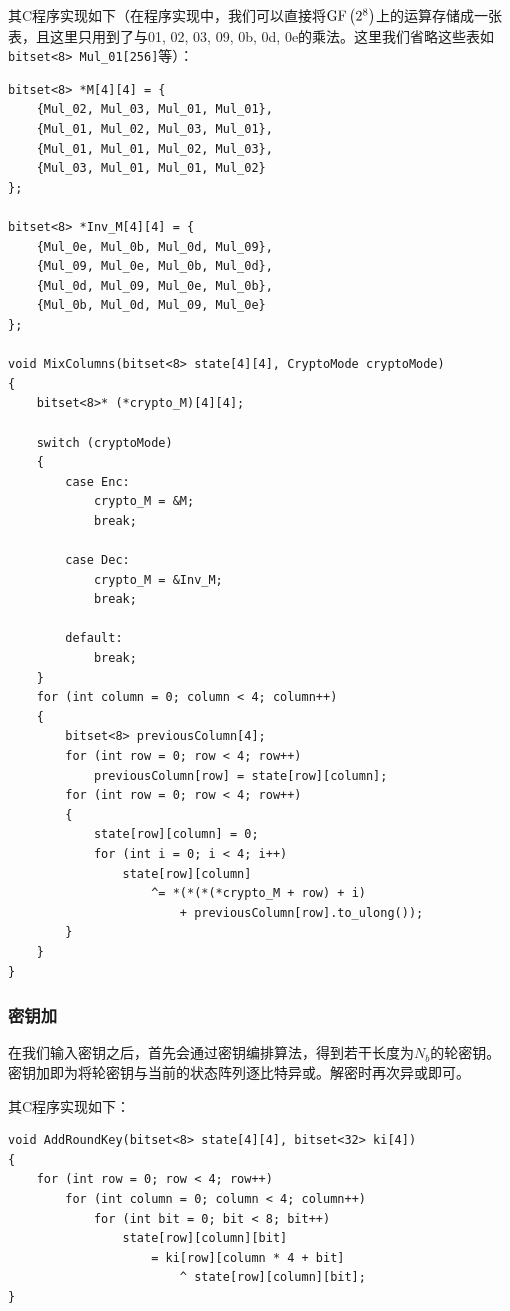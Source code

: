 其C程序实现如下（在程序实现中，我们可以直接将$\mathrm{GF}\left( {2^8}\right)$上的运算存储成一张表，且这里只用到了与01, 02, 03, 09, 0b, 0d, 0e的乘法。这里我们省略这些表如\verb`bitset<8> Mul_01[256]`等）：
\begin{prove}
\begin{verbatim}
bitset<8> *M[4][4] = {
    {Mul_02, Mul_03, Mul_01, Mul_01},
    {Mul_01, Mul_02, Mul_03, Mul_01},
    {Mul_01, Mul_01, Mul_02, Mul_03},
    {Mul_03, Mul_01, Mul_01, Mul_02}
};

bitset<8> *Inv_M[4][4] = {
    {Mul_0e, Mul_0b, Mul_0d, Mul_09},
    {Mul_09, Mul_0e, Mul_0b, Mul_0d},
    {Mul_0d, Mul_09, Mul_0e, Mul_0b},
    {Mul_0b, Mul_0d, Mul_09, Mul_0e}
};

void MixColumns(bitset<8> state[4][4], CryptoMode cryptoMode)
{
    bitset<8>* (*crypto_M)[4][4];

    switch (cryptoMode)
    {
        case Enc:
            crypto_M = &M;
            break;
            
        case Dec:
            crypto_M = &Inv_M;
            break;
            
        default:
            break;
    }
    for (int column = 0; column < 4; column++)
    {
        bitset<8> previousColumn[4];
        for (int row = 0; row < 4; row++)
            previousColumn[row] = state[row][column];
        for (int row = 0; row < 4; row++)
        {
            state[row][column] = 0;
            for (int i = 0; i < 4; i++)
                state[row][column]
                    ^= *(*(*(*crypto_M + row) + i)
                        + previousColumn[row].to_ulong());
        }
    }
}
\end{verbatim}
\end{prove}
\subsubsection{密钥加}
在我们输入密钥之后，首先会通过密钥编排算法，得到若干长度为$N_b$的轮密钥。密钥加即为将轮密钥与当前的状态阵列逐比特异或。解密时再次异或即可。\par
其C程序实现如下：
\begin{prove}
\begin{verbatim}
void AddRoundKey(bitset<8> state[4][4], bitset<32> ki[4])
{
    for (int row = 0; row < 4; row++)
        for (int column = 0; column < 4; column++)
            for (int bit = 0; bit < 8; bit++)
                state[row][column][bit]
                    = ki[row][column * 4 + bit]
                        ^ state[row][column][bit];
}
\end{verbatim}
\end{prove}
